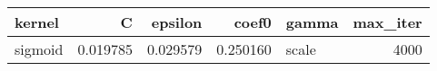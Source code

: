 \begin{tabular}{lrrrlr}
\toprule
kernel & C & epsilon & coef0 & gamma & max_iter \\
\midrule
sigmoid & 0.019785 & 0.029579 & 0.250160 & scale & 4000 \\
\bottomrule
\end{tabular}
